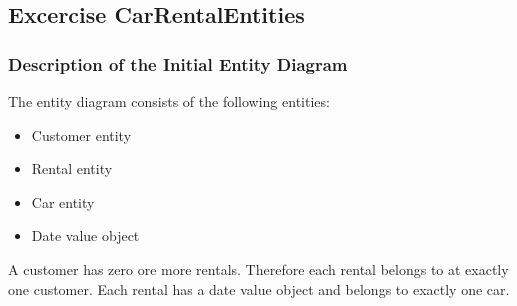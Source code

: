 \label{cha:design_of_data_and_functionality}

\subsection{Excercise CarRentalEntities}
\label{sec:exercise_car_rental_entities}
\subsubsection*{Description of the Initial Entity Diagram}
The entity diagram consists of the following entities:
\begin{itemize}
    \item Customer entity
    \item Rental entity
    \item Car entity
    \item Date value object
\end{itemize}
A customer has zero ore more rentals.
Therefore each rental belongs to at exactly one customer.
Each rental has a date value object and belongs to exactly one car.

